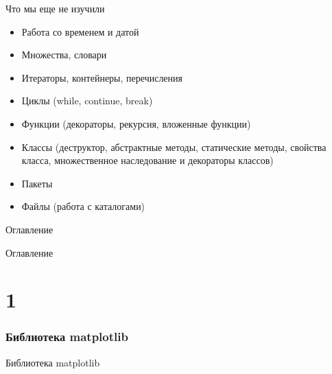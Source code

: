 \documentclass[12pt]{beamer}
\begin{document}
\begin{frame}{Что мы еще не изучили}
\begin{itemize}
\item Работа со временем и датой
\item Множества, словари
\item Итераторы, контейнеры, перечисления
\item Циклы (while, continue, break)
\item Функции (декораторы, рекурсия, вложенные функции)
\item Классы (деструктор, абстрактные методы, статические методы, свойства класса, множественное наследование и декораторы классов)
\item Пакеты
\item Файлы (работа с каталогами)
\end{itemize}
\end{frame}


\begin{frame}[t]{Оглавление}
\tableofcontents[part=1]
\end{frame}

\begin{frame}{Оглавление}
\tableofcontents[part=2]
\end{frame}



\part{1}

\section{Библиотека matplotlib}
\begin{frame}{Библиотека matplotlib}
 \\
\vspace{0.3cm}
\href{https://matplotlib.org/}{}
\end{frame}
\end{document}
